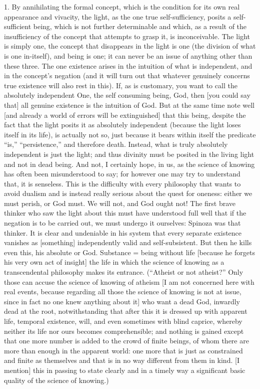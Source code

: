 1. By annihilating the formal concept,
which is the condition for its own
real appearance and vivacity,
the light, as the one true self-sufficiency,
posits a self-sufficient being,
which is not further determinable and
which, as a result of
the insufficiency of the concept
that attempts to grasp it,
is inconceivable.
The light is simply one,
the concept that disappears in the light is one
(the division of what is one in-itself),
and being is one;
it can never be an issue of
anything other than these three.
The one existence arises in
the intuition of what is independent,
and in the concept’s negation
(and it will turn out that whatever genuinely concerns
true existence will also rest in this).
If, as is customary, you want to call
the absolutely independent One,
the self consuming being, God,
then [you could say that] all
genuine existence is the intuition of God.
But at the same time note well
[and already a world of errors will be extinguished]
that this being, despite the fact that
the light posits it as absolutely independent
(because the light loses itself in its life),
is actually not so, just because it bears within itself
the predicate “is,” “persistence,” and therefore death.
Instead, what is truly absolutely
independent is just the light;
and thus divinity must be posited
in the living light and not in dead being.
And not, I certainly hope, in us, as
the science of knowing has
often been misunderstood to say;
for however one may try to understand that,
it is senseless.
This is the difficulty with every philosophy
that wants to avoid dualism
and is instead really serious about
the quest for oneness:
either we must perish, or God must.
We will not, and God ought not!
The first brave thinker
who saw the light about this
must have understood full well that
if the negation is to be carried out,
we must undergo it ourselves:
Spinoza was that thinker.
It is clear and undeniable in his system
that every separate existence vanishes
as [something] independently valid and self-subsistent.
But then he kills even this, his absolute or God.
Substance = being without life
[because he forgets his very own act of insight]
the life in which the science of knowing
as a transcendental philosophy makes its entrance.
(“Atheist or not atheist?”
Only those can accuse the science of knowing of atheism
[I am not concerned here with real events,
because regarding all those the science of knowing is not at issue,
since in fact no one knew anything about it]
who want a dead God, inwardly dead at the root,
notwithstanding that after this it is dressed up
with apparent life, temporal existence, will,
and even sometimes with blind caprice,
whereby neither its life nor ours becomes comprehensible;
and nothing is gained except that one more
number is added to the crowd of finite beings,
of whom there are more than enough in the apparent world:
one more that is just as constrained and finite as themselves
and that is in no way different from them in kind.
[I mention] this in passing to state clearly and in a timely way
a significant basic quality of the science of knowing.)

